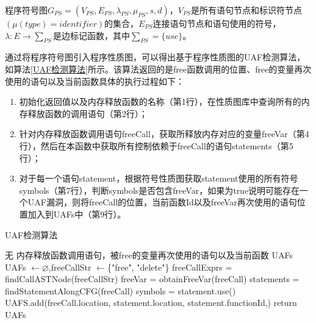 {\begin{definition}
 \label{符号图定义}
 程序符号图$G_{PS}=(V_{PS},E_{PS},\lambda_{PS} ,\mu_{PS}, s,d)$，$V_{PS}$是所有语句节点和标识符节点$(\mu(type) = identifier)$的集合，$E_{PS}$连接语句节点和语句使用的符号，$\lambda : E \rightarrow \sum_{PS}$是边标记函数，其中$\sum_{PS} = \{use\}$。
\end{definition}

通过将程序符号图引入程序性质图，可以得出基于程序性质图的UAF检测算法，如算法\ref{UAF检测算法}所示。该算法返回的是free函数调用的位置、free的变量再次使用的语句以及当前函数具体的执行过程如下：

\begin{enumerate}[(1)]
\item 初始化返回值以及内存释放函数的名称（第1行），在性质图库中查询所有的内存释放函数的调用语句（第2行）；
\item 针对内存释放函数调用语句freeCall，获取所释放内存对应的变量freeVar（第4行），然后在本函数中获取所有控制依赖于freeCall的语句statements（第5行）；
\item 对于每一个语句statement，根据符号性质图获取statement使用的所有符号symbols（第7行），判断symbols是否包含freeVar，如果为true说明可能存在一个UAF漏洞，则将freeCall的位置，当前函数Id以及freeVar再次使用的语句位置加入到UAFs中（第9行）。
\end{enumerate}

\begin{algorithm}
	\renewcommand{\algorithmicrequire}{\textbf{Input:}}
	\renewcommand{\algorithmicensure}{\textbf{Output:}}
	\caption{UAF检测算法}
	\label{UAF检测算法}
	\begin{algorithmic}[1]
		\REQUIRE 无
		\ENSURE 内存释放函数调用语句，被free的变量再次使用的语句以及当前函数 UAFs
		\STATE UAFs $\leftarrow \varnothing$,freeCallStr $\leftarrow$\{"free", "delete"\}
		\STATE freeCallExprs = findCallASTNode(freeCallStr)
			\STATE freeVar = obtainFreeVar(freeCall)
			\STATE statements = findStatementAlongCFG(freeCall)
				\STATE symbols = statement.use()
					\STATE UAFS.add(freeCall.location, statement.location, statement.functionId,)
				\ENDIF
			\ENDFOR
		\ENDFOR
	\STATE return UAFs	
	\end{algorithmic}
\end{algorithm}


}
